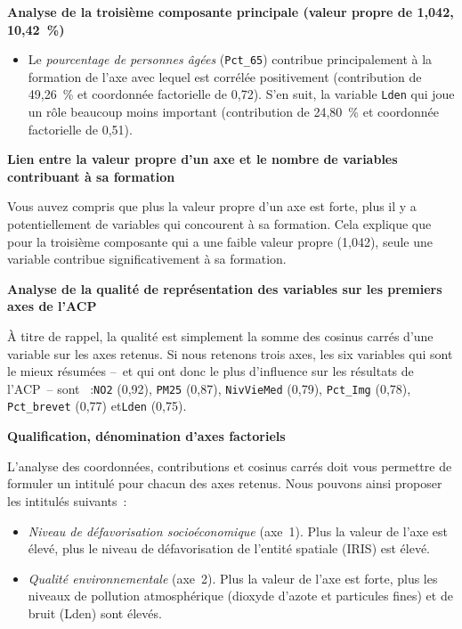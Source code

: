 \documentclass[
  11pt,
  french,
]{book}
\makeatletter
\providecommand{\tightlist}{%
  \setlength{\itemsep}{0pt}\setlength{\parskip}{0pt}}
\newenvironment{kframev}{%
\medskip{}
\setlength{\fboxsep}{.8em}
 \def\at@end@of@kframev{}%
 \ifinner\ifhmode%
  \def\at@end@of@kframev{\end{minipage}}%
  \begin{minipage}{\columnwidth}%
 \fi\fi%
 \def\FrameCommand##1{\hskip\@totalleftmargin \hskip-\fboxsep
 \colorbox{shadebluecolor}{##1}\hskip-\fboxsep
     \hskip-\linewidth \hskip-\@totalleftmargin \hskip\columnwidth}%
 \MakeFramed {\advance\hsize-\width
   \@totalleftmargin\z@ \linewidth\hsize
   \@setminipage}}%
 {\par\unskip\endMakeFramed%
 \at@end@of@kframev}
\newenvironment{rmdblock}[1]
  {
  \begin{itemize}
  \renewcommand{\labelitemi}{
    \raisebox{-.7\height}[0pt][0pt]{
      {\setkeys{Gin}{width=3em,keepaspectratio}\texttt{[image: images/\#1]}}
    }
  }
  \setlength{\fboxsep}{1em}
  \begin{kframev}
  \small
  \item
  }
  {
  \end{kframev}
  \end{itemize}
  }
\newenvironment{bloc_astuce}
  {\begin{rmdblock}{astuce}}
  {\end{rmdblock}}
\makeatother
\begin{document}
\textbf{Analyse de la troisième composante principale (valeur propre de 1,042, 10,42~\%)}

\begin{itemize}
\tightlist
\item
  Le \emph{pourcentage de personnes âgées} (\texttt{Pct\_65}) contribue principalement à la formation de l'axe avec lequel est corrélée positivement (contribution de 49,26~\% et coordonnée factorielle de 0,72). S'en suit, la variable \texttt{Lden} qui joue un rôle beaucoup moins important (contribution de 24,80~\% et coordonnée factorielle de 0,51).
\end{itemize}

\begin{bloc_astuce}
\textbf{Lien entre la valeur propre d'un axe et le nombre de variables contribuant à sa formation}

Vous auvez compris que plus la valeur propre d'un axe est forte, plus il y a potentiellement de variables qui concourent à sa formation. Cela explique que pour la troisième composante qui a une faible valeur propre (1,042), seule une variable contribue significativement à sa formation.

\end{bloc_astuce}

\textbf{Analyse de la qualité de représentation des variables sur les premiers axes de l'ACP}

À titre de rappel, la qualité est simplement la somme des cosinus carrés d'une variable sur les axes retenus. Si nous retenons trois axes, les six variables qui sont le mieux résumées --~et qui ont donc le plus d'influence sur les résultats de l'ACP~-- sont ~:\texttt{NO2} (0,92), \texttt{PM25} (0,87), \texttt{NivVieMed} (0,79), \texttt{Pct\_Img} (0,78), \texttt{Pct\_brevet} (0,77) et\texttt{Lden} (0,75).

\textbf{Qualification, dénomination d'axes factoriels}

L'analyse des coordonnées, contributions et cosinus carrés doit vous permettre de formuler un intitulé pour chacun des axes retenus. Nous pouvons ainsi proposer les intitulés suivants~:

\begin{itemize}
\tightlist
\item
  \emph{Niveau de défavorisation socioéconomique} (axe~1). Plus la valeur de l'axe est élevé, plus le niveau de défavorisation de l'entité spatiale (IRIS) est élevé.
\item
  \emph{Qualité environnementale} (axe~2). Plus la valeur de l'axe est forte, plus les niveaux de pollution atmosphérique (dioxyde d'azote et particules fines) et de bruit (Lden) sont élevés.
\end{itemize}
\end{document}
